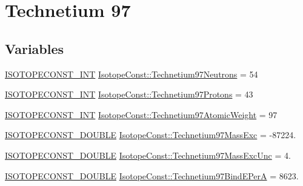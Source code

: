 \hypertarget{group___isotope_const-_technetium-_tc97}{}\section{Technetium 97}
\label{group___isotope_const-_technetium-_tc97}
\subsection*{Variables}
\begin{DoxyCompactItemize}
\item 
\mbox{\hyperlink{group___isotope_const-_macros_ga5f18360b3e99483a35c32d789e62621c}{I\+S\+O\+T\+O\+P\+E\+C\+O\+N\+S\+T\+\_\+\+I\+NT}} \mbox{\hyperlink{group___isotope_const-_technetium-_tc97_ga7baa8a1b3b1dd5754f8d38275ee02fdf}{Isotope\+Const\+::\+Technetium97\+Neutrons}} = 54
\item 
\mbox{\hyperlink{group___isotope_const-_macros_ga5f18360b3e99483a35c32d789e62621c}{I\+S\+O\+T\+O\+P\+E\+C\+O\+N\+S\+T\+\_\+\+I\+NT}} \mbox{\hyperlink{group___isotope_const-_technetium-_tc97_ga370dc741a60ef59fa5d3f355f717b1a1}{Isotope\+Const\+::\+Technetium97\+Protons}} = 43
\item 
\mbox{\hyperlink{group___isotope_const-_macros_ga5f18360b3e99483a35c32d789e62621c}{I\+S\+O\+T\+O\+P\+E\+C\+O\+N\+S\+T\+\_\+\+I\+NT}} \mbox{\hyperlink{group___isotope_const-_technetium-_tc97_ga0dfbb258cd50ce878197c841f909594e}{Isotope\+Const\+::\+Technetium97\+Atomic\+Weight}} = 97
\item 
\mbox{\hyperlink{group___isotope_const-_macros_ga8f45a7272ce02c0b4c65c44636ed719a}{I\+S\+O\+T\+O\+P\+E\+C\+O\+N\+S\+T\+\_\+\+D\+O\+U\+B\+LE}} \mbox{\hyperlink{group___isotope_const-_technetium-_tc97_gaba0744e2fabc1da2c0bfcb5dbd028b2e}{Isotope\+Const\+::\+Technetium97\+Mass\+Exc}} = -\/87224.
\item 
\mbox{\hyperlink{group___isotope_const-_macros_ga8f45a7272ce02c0b4c65c44636ed719a}{I\+S\+O\+T\+O\+P\+E\+C\+O\+N\+S\+T\+\_\+\+D\+O\+U\+B\+LE}} \mbox{\hyperlink{group___isotope_const-_technetium-_tc97_ga6cabd3eb8877c5db6ccf546fa1824802}{Isotope\+Const\+::\+Technetium97\+Mass\+Exc\+Unc}} = 4.
\item 
\mbox{\hyperlink{group___isotope_const-_macros_ga8f45a7272ce02c0b4c65c44636ed719a}{I\+S\+O\+T\+O\+P\+E\+C\+O\+N\+S\+T\+\_\+\+D\+O\+U\+B\+LE}} \mbox{\hyperlink{group___isotope_const-_technetium-_tc97_gaf10f00a47e112435dac4ef8753b87d42}{Isotope\+Const\+::\+Technetium97\+Bind\+E\+PerA}} = 8623.
\item 

\end{DoxyCompactItemize}
